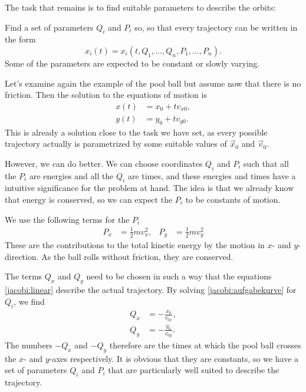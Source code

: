 The task that remains is to find suitable parameters to describe
the orbits:

\begin{aufgabe}
\label{jacobi:aufgabe}
Find a set of parameters 
$Q_i$ and $P_i$ so,
so that every trajectory can be written in the form
\begin{equation}
x_i(t) = x_i(t,Q_1,\dots,Q_n,P_1,\dots,P_n).
\label{jacobi:aufgabekurve}
\end{equation}
Some of the parameters are expected to be constant or slowly varying.
\end{aufgabe}

\begin{beispiel}
Let's examine again the example of the pool ball but assume now that
there is no friction.
Then the solution to the equations of motion is
\begin{equation}
\begin{aligned}
x(t)&=x_0 + tv_{x0},\\
y(t)&=y_0 + tv_{y0}.
\end{aligned}
\label{jacobi:linear}
\end{equation}
This is already a solution close to the task we have set, as every 
possible trajectory actually is parametrized by some suitable values
of $\vec{x}_0$ and $\vec{v}_0$.

However, we can do better.
We can choose coordinates $Q_i$ and $P_i$ such that all 
the $P_i$ are energies and all the $Q_i$ are times, and these
energies and times have a intuitive significance for the
problem at hand.
The idea is that we already know that energy is conserved, so
we can expect the $P_i$ to be constants of motion.

We use  the following terms for the $P_i$
\begin{equation*}
\begin{aligned}
P_x&=\frac12mv_x^2,&
P_y&=\frac12mv_y^2
\end{aligned}
\end{equation*}
These are the contributions to the total kinetic energy by the
motion in $x$- and $y$-direction.
As the ball rolls without friction, they are conserved.

The terms $Q_x$ and $Q_y$ need to be chosen in such a way that
the equations
\eqref{jacobi:linear}
describe the actual trajectory.
By solving \eqref{jacobi:aufgabekurve} for $Q_i$, we find
\begin{equation*}
\begin{aligned}
Q_x&=-\frac{x_0}{v_{0x}},\\
Q_y&=-\frac{y_0}{v_{0y}}.
\end{aligned}
\end{equation*}
The numbers $-Q_x$ and $-Q_y$ therefore are the times at which the pool
ball crosses the $x$- and $y$-axes respectively.
It is obvious that they are constants, so we have a set of parameters
$Q_i$ and $P_i$ that are particularly well suited to describe the
trajectory.
\end{beispiel}

